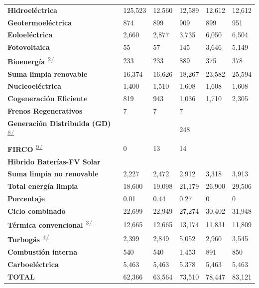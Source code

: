 \documentclass{sener2025}
\begin{document}
\begin{tabladoradoLargo}
\begin{longtable}{B{3cm}p{2.20cm}p{2.20cm}p{2.20cm}p{2.20cm}p{2.20cm}}
    \textbf{Hidroeléctrica} & 125,523 & 12,560 & 12,589 & 12,612 & 12,612 \\
    \textbf{Geotermoeléctrica} & 874 & 899 & 909 & 899 & 951 \\
    \textbf{Eoloeléctrica} & 2,660 & 2,877 & 3,735 & 6,050 & 6,504 \\
    \textbf{Fotovoltaica} & 55 & 57 & 145 & 3,646 & 5,149 \\
    \textbf{Bioenergía \textsuperscript{\hyperlink{nota2}{\textcolor{gray}{2/}}}} & 233 & 233 & 889 & 375 & 378 \\
    \textbf{Suma limpia renovable} & 16,374 & 16,626 & 18,267 & 23,582 & 25,594 \\
    \textbf{Nucleoeléctrica} & 1,400 & 1,510 & 1,608 & 1,608 & 1,608 \\
    \textbf{Cogeneración Eficiente} & 819 & 943 & 1,036 & 1,710 & 2,305 \\
    \textbf{Frenos Regenerativos} & 7 & 7 & 7 &  &  \\
    \textbf{Generación Distribuida (GD) \textsuperscript{\hyperlink{nota8}{\textcolor{gray}{8/}}}} &  &  & 248 &  &  \\
    \textbf{FIRCO \textsuperscript{\hyperlink{nota9}{\textcolor{gray}{9/}}}} & 0 & 13 & 14 &  &  \\
    \textbf{Hibrido Baterías-FV Solar} &  &  &  &  &  \\
    \textbf{Suma limpia no renovable} & 2,227 & 2,472 & 2,912 & 3,318 & 3,913 \\
    \textbf{Total energía limpia} & 18,600 & 19,098 & 21,179 & 26,900 & 29,506 \\
    \textbf{Porcentaje} & 0.01 & 0.44 & 0.27 & 0 & 0 \\
    \textbf{Ciclo combinado} & 22,699 & 22,949 & 27,274 & 30,402 & 31,948 \\
    \textbf{Térmica convencional \textsuperscript{\hyperlink{nota3}{\textcolor{gray}{3/}}}} & 12,665 & 12,665 & 13,174 & 11,831 & 11,809 \\
    \textbf{Turbogás \textsuperscript{\hyperlink{nota4}{\textcolor{gray}{4/}}}} & 2,399 & 2,849 & 5,052 & 2,960 & 3,545 \\
    \textbf{Combustión interna} & 540 & 540 & 1,453 & 891 & 850 \\
    \textbf{Carboeléctrica} & 5,463 & 5,463 & 5,378 & 5,463 & 5,463 \\
    \textbf{TOTAL} & 62,366 & 63,564 & 73,510 & 78,447 & 83,121 \\
  \end{longtable}


\end{tabladoradoLargo}
\end{document}
